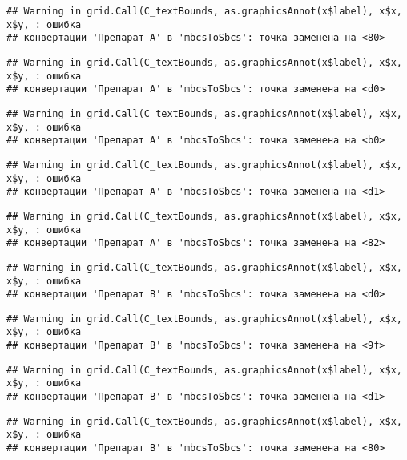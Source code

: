 \documentclass[
]{article}
\begin{document}
\begin{verbatim}
## Warning in grid.Call(C_textBounds, as.graphicsAnnot(x$label), x$x, x$y, : ошибка
## конвертации 'Препарат A' в 'mbcsToSbcs': точка заменена на <80>
\end{verbatim}

\begin{verbatim}
## Warning in grid.Call(C_textBounds, as.graphicsAnnot(x$label), x$x, x$y, : ошибка
## конвертации 'Препарат A' в 'mbcsToSbcs': точка заменена на <d0>
\end{verbatim}

\begin{verbatim}
## Warning in grid.Call(C_textBounds, as.graphicsAnnot(x$label), x$x, x$y, : ошибка
## конвертации 'Препарат A' в 'mbcsToSbcs': точка заменена на <b0>
\end{verbatim}

\begin{verbatim}
## Warning in grid.Call(C_textBounds, as.graphicsAnnot(x$label), x$x, x$y, : ошибка
## конвертации 'Препарат A' в 'mbcsToSbcs': точка заменена на <d1>
\end{verbatim}

\begin{verbatim}
## Warning in grid.Call(C_textBounds, as.graphicsAnnot(x$label), x$x, x$y, : ошибка
## конвертации 'Препарат A' в 'mbcsToSbcs': точка заменена на <82>
\end{verbatim}

\begin{verbatim}
## Warning in grid.Call(C_textBounds, as.graphicsAnnot(x$label), x$x, x$y, : ошибка
## конвертации 'Препарат B' в 'mbcsToSbcs': точка заменена на <d0>
\end{verbatim}

\begin{verbatim}
## Warning in grid.Call(C_textBounds, as.graphicsAnnot(x$label), x$x, x$y, : ошибка
## конвертации 'Препарат B' в 'mbcsToSbcs': точка заменена на <9f>
\end{verbatim}

\begin{verbatim}
## Warning in grid.Call(C_textBounds, as.graphicsAnnot(x$label), x$x, x$y, : ошибка
## конвертации 'Препарат B' в 'mbcsToSbcs': точка заменена на <d1>
\end{verbatim}

\begin{verbatim}
## Warning in grid.Call(C_textBounds, as.graphicsAnnot(x$label), x$x, x$y, : ошибка
## конвертации 'Препарат B' в 'mbcsToSbcs': точка заменена на <80>
\end{verbatim}
\end{document}
